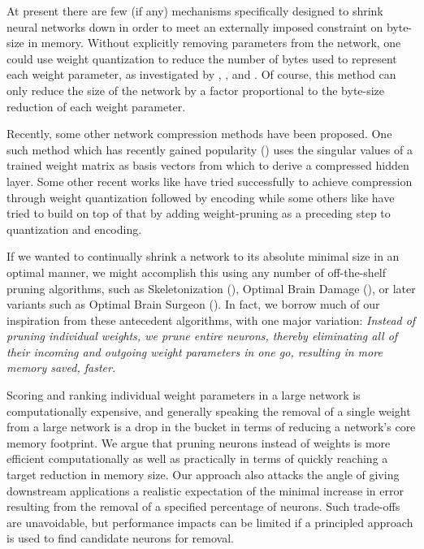 At present there are few (if any) mechanisms specifically designed to shrink neural networks down in order to meet an externally imposed constraint on byte-size in memory. Without explicitly removing parameters from the network, one could use weight quantization to reduce the number of bytes used to represent each weight parameter, as investigated by \cite{balzer1991weight}, \cite{dundar1994effects}, and \cite{hoehfeld1992learning}. Of course, this method can only reduce the size of the network by a factor proportional to the byte-size reduction of each weight parameter. 

Recently, some other network compression methods have been proposed. One such method which has recently gained popularity (\cite{prabhavalkar2016svd}) uses the singular values of a trained weight matrix as basis vectors from which to derive a compressed hidden layer. Some other recent works like \cite{Anders2016quant} have tried successfully to achieve compression through weight quantization followed by encoding while some others like \cite{deepcompression2016} have tried to build on top of that by adding weight-pruning as a preceding step to quantization and encoding. 

If we wanted to continually shrink a network to its absolute minimal size in an optimal manner, we might accomplish this using any number of off-the-shelf pruning algorithms, such as Skeletonization (\cite{mozer1989skeletonization}), Optimal Brain Damage (\cite{lecun1989optimal}), or later variants such as Optimal Brain Surgeon (\cite{hassibi1993second}). In fact, we borrow much of our inspiration from these antecedent algorithms, with one major variation:\textit{ Instead of pruning individual weights, we prune entire neurons, thereby eliminating all of their incoming and outgoing weight parameters in one go, resulting in more memory saved, faster.}

Scoring and ranking individual weight parameters in a large network is computationally expensive, and generally speaking the removal of a single weight from a large network is a drop in the bucket in terms of reducing a network's core memory footprint.  We argue that pruning neurons instead of weights is more efficient computationally as well as practically in terms of quickly reaching a target reduction in memory size. Our approach also attacks the angle of giving downstream applications a realistic expectation of the minimal increase in error resulting from the removal of a specified percentage of neurons. Such trade-offs are unavoidable, but performance impacts can be limited if a principled approach is used to find candidate neurons for removal. 

